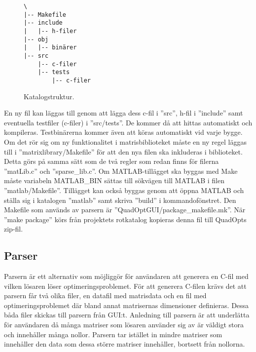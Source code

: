 \begin{figure}[H]
  \centering
  \begin{verbatim}
\
|-- Makefile
|-- include
|   |-- h-filer
|-- obj
|   |-- binärer
|-- src
    |-- c-filer
    |-- tests
        |-- c-filer
  \end{verbatim}
  \caption{Katalogstruktur.}
  \label{fig:katalogstruktur}
\end{figure}

\noindent En ny fil kan läggas till genom att lägga dess c-fil i ''src'', h-fil i ''include'' samt eventuella testfiler (c-filer) i ''src/tests''. De kommer då att hittas automatiskt och kompileras. Testbinärerna kommer även att köras automatiskt vid varje bygge. Om det rör sig om ny funktionalitet i matrisbiblioteket måste en ny regel läggas till i ''matrixlibrary/Makefile'' för att den nya filen ska inkluderas i biblioteket. Detta görs på samma sätt som de två regler som redan finns för filerna ''matLib.c'' och ''sparse\_lib.c''.
\newline
\newline
Om MATLAB-tillägget ska byggas med Make måste variabeln MATLAB\_BIN sättas till sökvägen till MATLAB i filen ''matlab/Makefile''. Tillägget kan också byggas genom att öppna MATLAB och ställa sig i katalogen ''matlab'' samt skriva ''build'' i kommandofönstret.
\newline
\newline
Den Makefile som används av parsern är ''QuadOptGUI/package\_makefile.mk''. När ''make package'' körs från projektets rotkatalog kopieras denna fil till QuadOpts zip-fil.


\subsection{Parser}
Parsern är ett alternativ som möjliggör för användaren att generera en C-fil med vilken lösaren löser optimeringsproblemet. För att generera C-filen krävs det att parsern får två olika filer, en datafil med matrisdata och en fil med optimeringsproblemet där bland annat matrisernas dimensioner definieras. Dessa båda filer skickas till parsern från GUI:t. Anledning till parsern är att underlätta för användaren då många matriser som lösaren använder sig av är väldigt stora och innehåller många nollor. Parsern tar istället in mindre matriser som innehåller den data som dessa större matriser innehåller, bortsett från nollorna.
